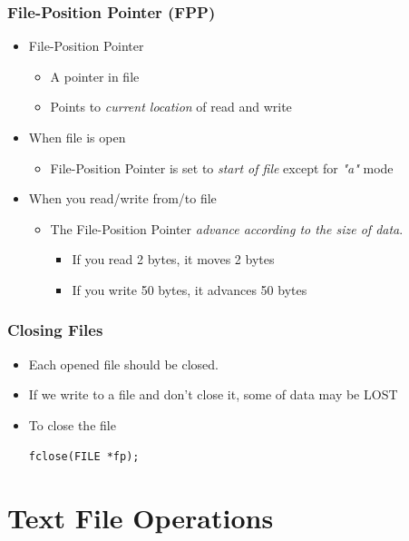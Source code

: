 \documentclass{../c-lecture}
\begin{document}
\begin{frame}
  \frametitle{File-Position Pointer (FPP)}
  \begin{itemize}
    \item File-Position Pointer
    \begin{itemize}
      \item A pointer in file
      \item
        Points to \textit{\color{YellowOrange} current location} of read and
        write

    \end{itemize}
    \item When file is open
    \begin{itemize}
      \item
        File-Position Pointer is set to
        \textit{\color{Cyan} start of file} except for
        \textit{\color{LimeGreen}"a"} mode

    \end{itemize}
    \item When you read/write from/to file
    \begin{itemize}
      \item
        The File-Position Pointer
        \textit{\color{Violet} advance according to the size of data}.

      \begin{itemize}
        \item If you read 2 bytes, it moves 2 bytes
        \item If you write 50 bytes, it advances 50 bytes
      \end{itemize}
    \end{itemize}
  \end{itemize}
\end{frame}

\begin{frame}[fragile]
  \frametitle{Closing Files}
  \begin{itemize}
    \item Each opened file should be closed.
    \item If we write to a file and don’t close it, some of data may be LOST
    \item To close the file
    \begin{verbatim}
fclose(FILE *fp);
    \end{verbatim}
  \end{itemize}
\end{frame}

\section{Text File Operations}
\end{document}
